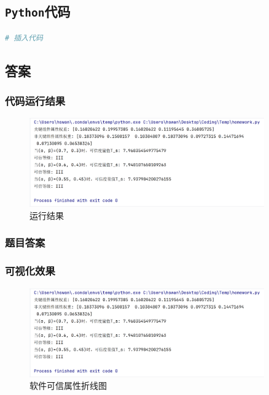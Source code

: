 \documentclass{article}
\begin{document}
\subsection{\texttt{Python}代码}

\begin{lstlisting}[language=Python]
	# 插入代码
\end{lstlisting}

\subsection{答案}

\subsubsection{代码运行结果}

\begin{figure}[H]
	\centering
	\includegraphics[width=0.9\textwidth]{img/1.png}
	\caption{运行结果}
\end{figure}

\subsubsection{题目答案}

\subsubsection{可视化效果}

\begin{figure}[H]
	\centering
	\includegraphics[width=0.9\textwidth]{img/1.png}
	\caption{软件可信属性折线图}
\end{figure}
\end{document}
